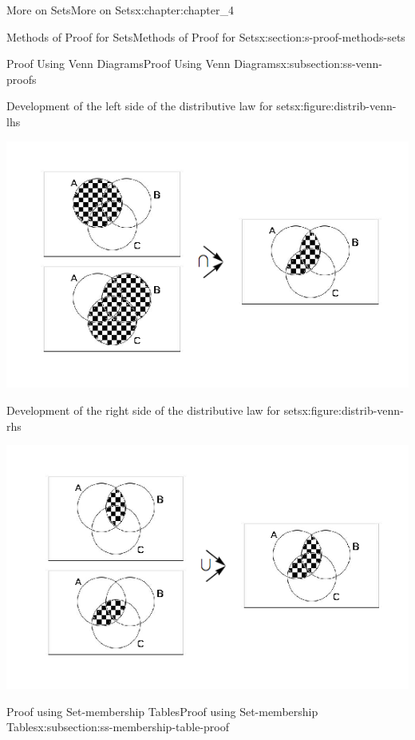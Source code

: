 \documentclass[oneside,10pt,]{book}
\begin{document}
\begin{chapterptx}{More on Sets}{}{More on Sets}{}{}{x:chapter:chapter_4}
\begin{sectionptx}{Methods of Proof for Sets}{}{Methods of Proof for Sets}{}{}{x:section:s-proof-methods-sets}
\begin{subsectionptx}{Proof Using Venn Diagrams}{}{Proof Using Venn Diagrams}{}{}{x:subsection:ss-venn-proofs}
\begin{figureptx}{Development of the left side of the distributive law for sets}{x:figure:distrib-venn-lhs}{}
\begin{image}{0}{1}{0}
\includegraphics[width=\linewidth]{images/distrib-venn-lhs.png}
\end{image}%
\tcblower
\end{figureptx}%
\begin{figureptx}{Development of the right side of the distributive law for sets}{x:figure:distrib-venn-rhs}{}%
\begin{image}{0}{1}{0}%
\includegraphics[width=\linewidth]{images/distrib-venn-rhs.png}
\end{image}%
\tcblower
\end{figureptx}%
\end{subsectionptx}
%
%
\typeout{************************************************}
\typeout{************************************************}
%
\begin{subsectionptx}{Proof using Set-membership Tables}{}{Proof using Set-membership Tables}{}{}{x:subsection:ss-membership-table-proof}

\end{subsectionptx}
\end{sectionptx}
\end{chapterptx}
\end{document}
